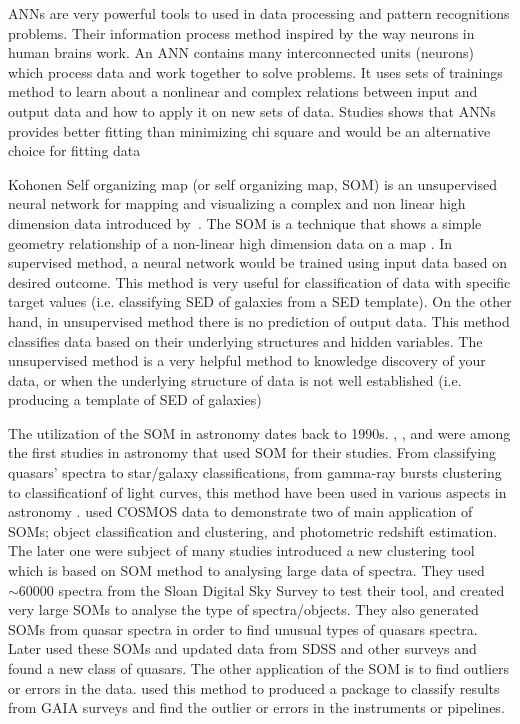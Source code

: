 ANNs are very powerful tools to used in data processing and pattern recognitions problems.
Their information process method inspired by the way neurons in human brains work.
An ANN contains many interconnected units (neurons) which process data and work together to solve problems.
It uses sets of trainings method to learn about a nonlinear and complex relations between input and output data and how to apply it on new sets of data.
Studies shows that ANNs provides better fitting than minimizing chi square and would be an alternative choice for fitting data \citep[e.g.][]{Marquez91,Moayed09}

Kohonen Self organizing map (or self organizing map, SOM) is an unsupervised neural network for mapping and visualizing a complex and non linear high dimension data introduced by~\citep{Kohonen82}.
The SOM is a technique that shows a simple geometry relationship of a non-linear high dimension data on a map \citep{Kohonen98}.
In supervised method, a neural network would be trained using input data based on desired outcome.
This method is very useful for classification of data with specific target values (i.e. classifying SED of galaxies from a SED template).
On the other hand, in unsupervised method there is no prediction of output data.
This method classifies data based on their underlying structures and hidden variables.
The unsupervised method is a very helpful method to knowledge discovery of your data, or when the underlying structure of data is not well established (i.e. producing a template of SED of galaxies) %

The utilization of the SOM in astronomy dates back to 1990s. 
\citet[][]{Odewahn92}, \citet[][]{Hernandez94}, and \citet[][]{Murtagh95} were among the first studies in astronomy that used SOM for their studies.
From classifying quasars' spectra to star/galaxy classifications, from gamma-ray bursts clustering to classificationf of light curves, this method have been used in various aspects in astronomy \citep[e.g.][]{Maehoenen95, Miller96,Andreon00,Balastegui01,Rajaniemi02,Brett04,Scaringi09}.
\citet{Geach12} used COSMOS data to demonstrate two of main application of SOMs; object classification and clustering, and photometric redshift estimation. 
The later one were subject of many studies \citep[e.g.][]{Kind14a}
\citet{In12} introduced a new clustering tool which is based on SOM method to analysing large data of spectra.
They used $\sim 60000$ spectra from the Sloan Digital Sky Survey \citep[SDSS;][]{Abazajian09}
to test their tool, and created very large SOMs to analyse the type of spectra/objects.
They also generated SOMs from quasar spectra in order to find unusual types of quasars spectra. Later \citet{Meusinger16} used these SOMs and updated data from SDSS and other surveys and found a new class of quasars.
The other application of the SOM is to find outliers or errors in the data.
\citet{Fustes13} used this method to produced a package to classify results from GAIA surveys and find the outlier or errors in the instruments or pipelines.




